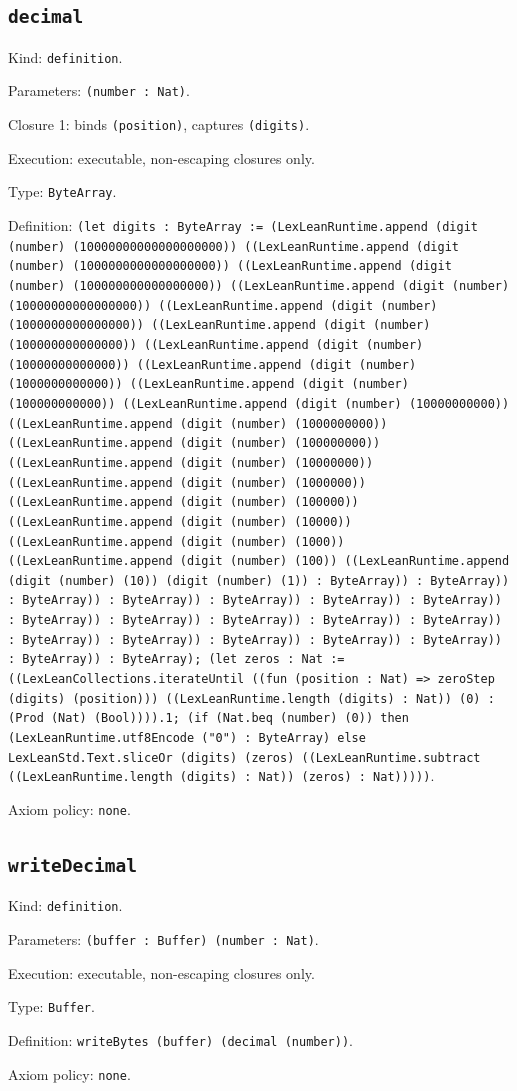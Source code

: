 \documentclass[11pt]{article}
\begin{document}
\subsection*{\texttt{decimal}}
\noindent Kind: \texttt{definition}.\par
\noindent Parameters: \texttt{(number : Nat)}.\par
\noindent Closure 1: binds \texttt{(position)}, captures \texttt{(digits)}.\par
\noindent Execution: executable, non-escaping closures only.\par
\noindent Type: \texttt{ByteArray}.\par
\noindent Definition: \texttt{(let digits : ByteArray := (LexLeanRuntime.append (digit (number) (10000000000000000000)) ((LexLeanRuntime.append (digit (number) (1000000000000000000)) ((LexLeanRuntime.append (digit (number) (100000000000000000)) ((LexLeanRuntime.append (digit (number) (10000000000000000)) ((LexLeanRuntime.append (digit (number) (1000000000000000)) ((LexLeanRuntime.append (digit (number) (100000000000000)) ((LexLeanRuntime.append (digit (number) (10000000000000)) ((LexLeanRuntime.append (digit (number) (1000000000000)) ((LexLeanRuntime.append (digit (number) (100000000000)) ((LexLeanRuntime.append (digit (number) (10000000000)) ((LexLeanRuntime.append (digit (number) (1000000000)) ((LexLeanRuntime.append (digit (number) (100000000)) ((LexLeanRuntime.append (digit (number) (10000000)) ((LexLeanRuntime.append (digit (number) (1000000)) ((LexLeanRuntime.append (digit (number) (100000)) ((LexLeanRuntime.append (digit (number) (10000)) ((LexLeanRuntime.append (digit (number) (1000)) ((LexLeanRuntime.append (digit (number) (100)) ((LexLeanRuntime.append (digit (number) (10)) (digit (number) (1)) : ByteArray)) : ByteArray)) : ByteArray)) : ByteArray)) : ByteArray)) : ByteArray)) : ByteArray)) : ByteArray)) : ByteArray)) : ByteArray)) : ByteArray)) : ByteArray)) : ByteArray)) : ByteArray)) : ByteArray)) : ByteArray)) : ByteArray)) : ByteArray)) : ByteArray); (let zeros : Nat := ((LexLeanCollections.iterateUntil ((fun (position : Nat) => zeroStep (digits) (position))) ((LexLeanRuntime.length (digits) : Nat)) (0) : (Prod (Nat) (Bool)))).1; (if (Nat.beq (number) (0)) then (LexLeanRuntime.utf8Encode ("0") : ByteArray) else LexLeanStd.Text.sliceOr (digits) (zeros) ((LexLeanRuntime.subtract ((LexLeanRuntime.length (digits) : Nat)) (zeros) : Nat)))))}.\par
\noindent Axiom policy: \texttt{none}.\par
\subsection*{\texttt{writeDecimal}}
\noindent Kind: \texttt{definition}.\par
\noindent Parameters: \texttt{(buffer : Buffer) (number : Nat)}.\par
\noindent Execution: executable, non-escaping closures only.\par
\noindent Type: \texttt{Buffer}.\par
\noindent Definition: \texttt{writeBytes (buffer) (decimal (number))}.\par
\noindent Axiom policy: \texttt{none}.\par
\end{document}
